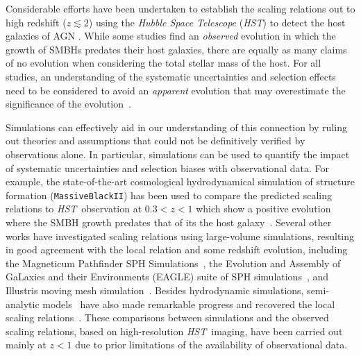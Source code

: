 \documentclass[twocolumn,trackchanges]{aastex63}
\newcommand{\hst}{{\it HST}}
\newcommand{\ding}[1]{\textcolor{red}{[{\bf Xuheng}: #1]}}
\begin{document}
Considerable efforts have been undertaken to establish the scaling relations out to high redshift ($z \lesssim2$) using the {\it Hubble Space Telescope} ({\it HST}) to detect the host galaxies of AGN \citep[e.g.,][]{Peng2006a, Tre++07, Woo++08,Jahnke2009,Bennert11,Schramm2013,Park15,Mechtley2016,Ding2019}. While some studies find an {\it observed} evolution in which the growth of SMBHs predates their host galaxies, there are equally as many claims of no evolution when considering the total stellar mass of the host. For all studies, an understanding of the systematic uncertainties and selection effects~\citep{Tre++07,Lauer2007,Schulze2014} need to be considered to avoid an {\it apparent} evolution that may overestimate the significance of the evolution~\citep{Volonteri2011}.


Simulations can effectively aid in our understanding of this connection by ruling out theories and assumptions that could not be definitively verified by observations alone. In particular, simulations can be used to quantify the impact of systematic uncertainties and selection biases with observational data. For example, the state-of-the-art cosmological hydrodynamical simulation of structure formation (\texttt{MassiveBlackII}) has been used to compare the predicted scaling relations to \hst\ observation at $0.3<z<1$ which show a positive evolution where the SMBH growth predates that of its the host galaxy~\citep{DeG++15}. Several other works have investigated scaling relations using large-volume simulations, resulting in good agreement with the local relation and some redshift evolution, including the Magneticum Pathfinder SPH Simulations~\citep{Steinborn2015}, the Evolution and Assembly of GaLaxies and their Environments (EAGLE) suite of SPH simulations~\citep{Schaye2015}, and Illustris moving mesh simulation~\citep{Sijacki2015, Vogelsberger2014, Li2019}. Besides hydrodynamic simulations, semi-analytic models~\citep[][\ding{Hi Nicola, do you think we can refer Thomas2019 here as another semi-analytic model? {\bf Nicola}: Hi Xuheng: no I think this is a N-body simulation, with a specific recipe for sub-grid physics. I would move Thomas 2019 at the end of the previous paragraph, mentioning it among the simulations}]{Menci2014, Menci2016, Thomas2019} have also made remarkable progress and recovered the local scaling relations~\citep{Kormendy13}. These comparisons between simulations and the observed scaling relations, based on high-resolution \hst\ imaging, have been carried out mainly at $z<1$ due to prior limitations of the availability of observational data.
\end{document}
